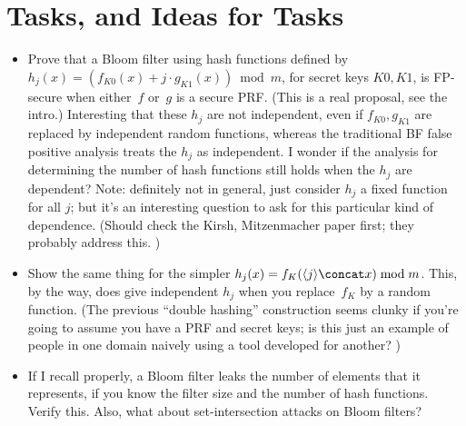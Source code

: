 \section{Tasks, and Ideas for Tasks}

\begin{itemize}
\item Prove that a Bloom filter using hash functions defined by
    $h_j(x) = \left( f_{K0}(x) + j\cdot g_{K1}(x)\right) \bmod
    m$, for secret keys $K0,K1$, is FP-secure when either~$f$
    or~$g$ is a secure PRF.  (This is a real proposal, see the
    intro.)  Interesting that these $h_j$ are not independent,
    even if $f_{K0},g_{K1}$ are replaced by independent random
    functions, whereas the traditional BF false positive
    analysis treats the $h_j$ as independent.  I wonder if the
    analysis for determining the number of hash functions still
    holds when the $h_j$ are dependent?  Note: definitely not in
    general, just consider $h_j$ a fixed function for all $j$;
    but it's an interesting question to ask for this particular
    kind of dependence.  (Should check the Kirsh, Mitzenmacher
    paper first; they probably address this. )

\item Show the same thing for the simpler $h_j(x) =
    f_{K}(\langle j \rangle \concat x) \bmod m$.  This, by the
    way, does give independent $h_j$ when you replace~$f_K$ by a
    random function.  (The previous ``double hashing''
    construction seems clunky if you're going to assume you have
    a PRF and secret keys; is this just an example of people in
    one domain naively using a tool developed for another? )

\item  If I recall properly, a Bloom filter leaks the number of elements that it represents, if you know the filter size and the number of hash functions.  Verify this.    Also, what about set-intersection attacks on Bloom filters?


\end{itemize}
